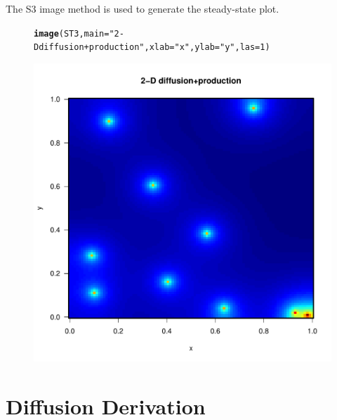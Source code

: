 \documentclass{tufte-handout}\usepackage[]{graphicx}\usepackage[]{color}
\makeatletter
\def\maxwidth{ %
  \ifdim\Gin@nat@width>\linewidth
    \linewidth
  \else
    \Gin@nat@width
  \fi
}
\newcommand{\hlnum}[1]{\textcolor[rgb]{0.686,0.059,0.569}{#1}}%
\newcommand{\hlstr}[1]{\textcolor[rgb]{0.192,0.494,0.8}{#1}}%
\newcommand{\hlstd}[1]{\textcolor[rgb]{0.345,0.345,0.345}{#1}}%
\newcommand{\hlkwc}[1]{\textcolor[rgb]{0.333,0.667,0.333}{#1}}%
\newcommand{\hlkwd}[1]{\textcolor[rgb]{0.737,0.353,0.396}{\textbf{#1}}}%
\newenvironment{kframe}{%
 \def\at@end@of@kframe{}%
 \ifinner\ifhmode%
  \def\at@end@of@kframe{\end{minipage}}%
  \begin{minipage}{\columnwidth}%
 \fi\fi%
 \def\FrameCommand##1{\hskip\@totalleftmargin \hskip-\fboxsep
 \colorbox{shadecolor}{##1}\hskip-\fboxsep
     \hskip-\linewidth \hskip-\@totalleftmargin \hskip\columnwidth}%
 \MakeFramed {\advance\hsize-\width
   \@totalleftmargin\z@ \linewidth\hsize
   \@setminipage}}%
 {\par\unskip\endMakeFramed%
 \at@end@of@kframe}
\newenvironment{knitrout}{}{} %
\makeatother
\begin{document}
The S3 image method is used to generate the steady-state plot.

\begin{figure}
\begin{knitrout}
\color{fgcolor}\begin{kframe}
\begin{alltt}
\hlkwd{image}\hlstd{(ST3,}\hlkwc{main}\hlstd{=}\hlstr{"2-D diffusion+production"}\hlstd{,} \hlkwc{xlab}\hlstd{=}\hlstr{"x"}\hlstd{,} \hlkwc{ylab}\hlstd{=}\hlstr{"y"}\hlstd{,} \hlkwc{las}\hlstd{=}\hlnum{1}\hlstd{)}
\end{alltt}
\end{kframe}
\includegraphics[width=\maxwidth]{figure/CreateImage-1} 

\end{knitrout}
\end{figure}


\section{Diffusion Derivation}
\end{document}
